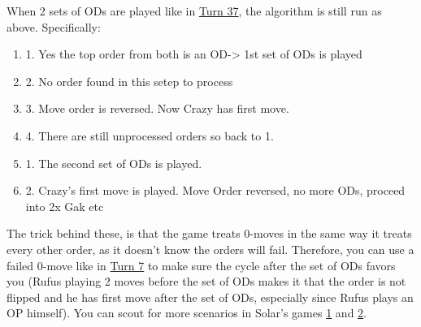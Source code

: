 When 2 sets of ODs are played like in \href{https://www.warzone.com/MultiPlayer?GameID=33173841}{Turn 37}, the algorithm is still run as above. Specifically:
\begin{enumerate}
    \item 1. Yes the top order from both is an OD-> 1st set of ODs is played
    \item 2. No order found in this setep to process
    \item 3. Move order is reversed. Now Crazy has first move.
    \item 4. There are still unprocessed orders so back to 1.
    \item 1. The second set of ODs is played.
    \item 2. Crazy's first move is played. Move Order reversed, no more ODs, proceed into 2x Gak etc
\end{enumerate}

The trick behind these, is that the game treats 0-moves in the same way it treats every other order, as it doesn't know the orders will fail. Therefore, you can use a failed 0-move like in \href{https://www.warzone.com/MultiPlayer?GameID=37574317}{Turn 7} to make sure the cycle after the set of ODs favors you (Rufus playing 2 moves before the set of ODs makes it that the order is not flipped and he has first move after the set of ODs, especially since Rufus plays an OP himself). You can scout for more scenarios in Solar's games \href{https://www.warzone.com/MultiPlayer?GameID=33965256}{1} and \href{https://www.warzone.com/MultiPlayer?GameID=33954581}{2}.